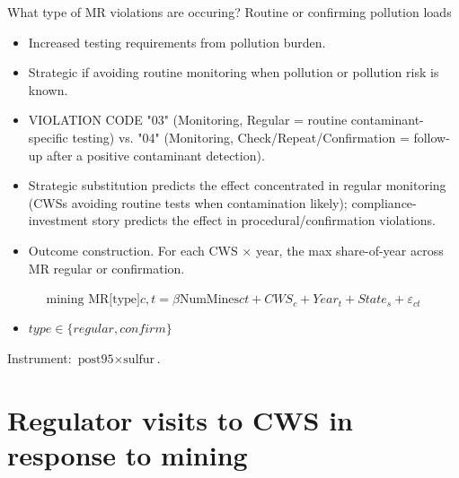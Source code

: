 \documentclass{beamer}
\begin{document}
\begin{frame}

\end{frame}

\begin{frame}{What type of MR violations are occuring? Routine or confirming pollution loads}

\begin{itemize}
    \item Increased testing requirements from pollution burden.
    \item Strategic if avoiding routine monitoring when pollution or pollution risk is known.
    \item VIOLATION CODE "03" (Monitoring, Regular = routine contaminant-specific testing) vs. "04" (Monitoring, Check/Repeat/Confirmation = follow-up after a positive contaminant detection). 
    \item Strategic substitution predicts the effect concentrated in regular monitoring (CWSs avoiding routine tests when contamination likely); compliance-investment story predicts the effect in procedural/confirmation violations.
    \item Outcome construction. For each CWS × year, the max share-of-year across MR regular or confirmation.
\end{itemize}

$$\text{mining MR[type]}{c,t} = \beta  \widehat{\text{NumMines}}{ct} + CWS_c + Year_t + State_s + \varepsilon_{ct}$$

\begin{itemize}
    \item $type \in \{regular, confirm\}$
\end{itemize}
Instrument: $\text{post95} \times \text{sulfur}$. 
\end{frame}

\begin{frame}

\end{frame}

\section{Regulator visits to CWS in response to mining}

\begin{frame}

\end{frame}

\begin{frame}

\end{frame}
\end{document}
